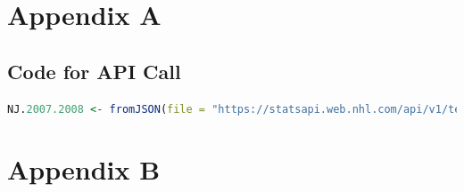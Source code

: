 \appendix
\section*{Appendix A}
\subsection*{Code for API Call}
\begin{lstlisting}[language=R,breaklines]
NJ.2007.2008 <- fromJSON(file = "https://statsapi.web.nhl.com/api/v1/teams/1/stats?season=20072008")
\end{lstlisting} 
\section*{Appendix B}
